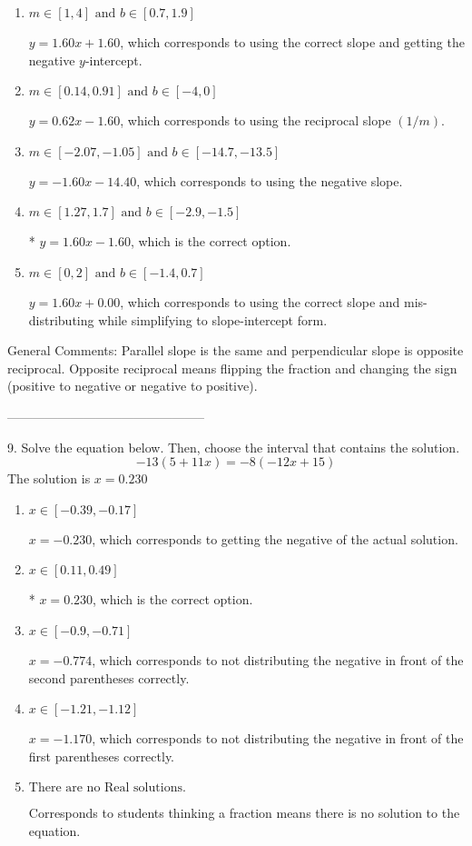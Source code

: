 \documentclass{article}[14pt]
\begin{document}
\begin{enumerate}[label=\Alph*.] 
\item $ m \in [1, 4] \text{ and } b \in [0.7, 1.9] $ 

  $y = 1.60x + 1.60$, which corresponds to using the correct slope and getting the negative $y$-intercept. 
\item $ m \in [0.14, 0.91] \text{ and } b \in [-4, 0] $ 

  $y = 0.62x - 1.60$, which corresponds to using the reciprocal slope $(1/m)$. 
\item $ m \in [-2.07, -1.05] \text{ and } b \in [-14.7, -13.5] $ 

  $y = -1.60x - 14.40$, which corresponds to using the negative slope. 
\item $ m \in [1.27, 1.7] \text{ and } b \in [-2.9, -1.5] $ 

 * $y = 1.60x - 1.60$, which is the correct option. 
\item $ m \in [0, 2] \text{ and } b \in [-1.4, 0.7] $ 

  $y = 1.60x + 0.00$, which corresponds to using the correct slope and mis-distributing while simplifying to slope-intercept form. 
\end{enumerate} 
 
General Comments: Parallel slope is the same and perpendicular slope is opposite reciprocal. Opposite reciprocal means flipping the fraction and changing the sign (positive to negative or negative to positive).

-----------------------------------------------

9. Solve the equation below. Then, choose the interval that contains the solution.
$$ -13(5+11 x) = -8(-12 x+15) $$ 
The solution is $ x = 0.230 $ 

\begin{enumerate}[label=\Alph*.] 
\item $ x \in [-0.39, -0.17] $ 

  $x = -0.230$, which corresponds to getting the negative of the actual solution. 
\item $ x \in [0.11, 0.49] $ 

 * $x = 0.230$, which is the correct option. 
\item $ x \in [-0.9, -0.71] $ 

  $x = -0.774$, which corresponds to not distributing the negative in front of the second parentheses correctly. 
\item $ x \in [-1.21, -1.12] $ 

  $x = -1.170$, which corresponds to not distributing the negative in front of the first parentheses correctly. 
\item $ \text{There are no Real solutions. } $ 

 Corresponds to students thinking a fraction means there is no solution to the equation. 
\end{enumerate} 
 
\end{document}
